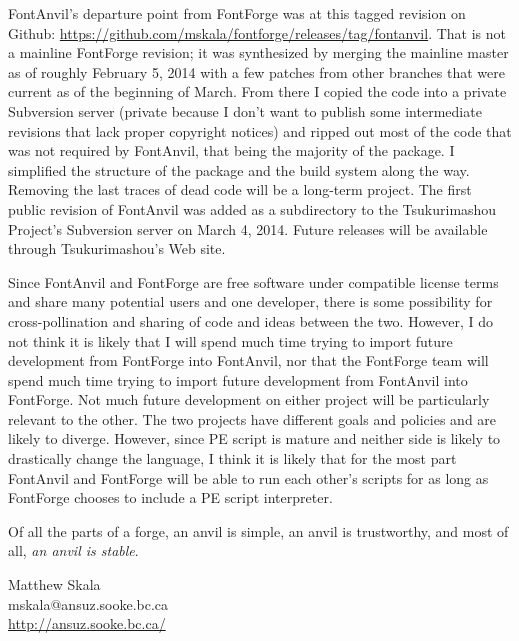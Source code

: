 \documentclass[11pt]{report}
\begin{document}
FontAnvil's departure point from FontForge was at this tagged revision on
Github: \url{https://github.com/mskala/fontforge/releases/tag/fontanvil}. 
That is not a mainline FontForge revision; it was synthesized by merging the
mainline master as of roughly February 5, 2014 with a few patches from other
branches that were current as of the beginning of March.  From there I
copied the code into a private Subversion server (private because I don't
want to publish some intermediate revisions that lack proper copyright
notices) and ripped out most of the code that was not required by FontAnvil,
that being the majority of the package.  I simplified the structure of the
package and the build system along the way.  Removing the last traces of
dead code will be a long-term project.  The first public revision of
FontAnvil was added as a subdirectory to the Tsukurimashou Project's
Subversion server on March 4, 2014.  Future releases will be available through
Tsukurimashou's Web site.

Since FontAnvil and FontForge are free software under compatible license
terms and share many potential users and one developer, there is some
possibility for cross-pollination and sharing of code and ideas between the
two.  However, I do not think it is likely that I will spend much time
trying to import future development from FontForge into FontAnvil, nor that
the FontForge team will spend much time trying to import future development
from FontAnvil into FontForge.  Not much future development on either
project will be particularly relevant to the other.  The two projects have
different goals and policies and are likely to diverge.  However, since PE
script is mature and neither side is likely to drastically change the
language, I think it is likely that for the most part FontAnvil and
FontForge will be able to run each other's scripts for as long as FontForge
chooses to include a PE script interpreter.

Of all the parts of a forge, an anvil is simple,
an anvil is trustworthy, and most of all, \emph{an anvil is stable}.

\vspace{1cm}

\noindent
Matthew Skala\\
mskala@ansuz.sooke.bc.ca\\
\url{http://ansuz.sooke.bc.ca/}

\clearpage

\end{document}
